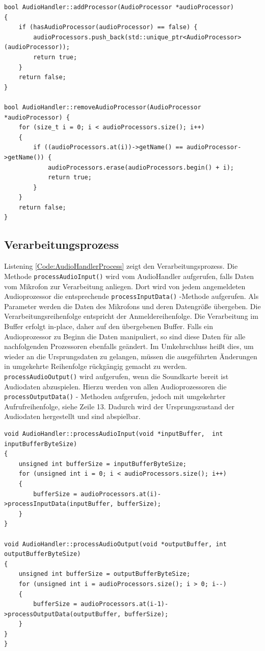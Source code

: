 \begin{lstlisting}[caption={An- und Abmeldeprozess von Audioprozessoren im AudioHandler},label={Code:AudioHandlerAdd}]
bool AudioHandler::addProcessor(AudioProcessor *audioProcessor)
{
	if (hasAudioProcessor(audioProcessor) == false) {
		audioProcessors.push_back(std::unique_ptr<AudioProcessor>(audioProcessor));
		return true;
	}
	return false;
}

bool AudioHandler::removeAudioProcessor(AudioProcessor *audioProcessor) {
	for (size_t i = 0; i < audioProcessors.size(); i++)
	{
		if ((audioProcessors.at(i))->getName() == audioProcessor->getName()) {
			audioProcessors.erase(audioProcessors.begin() + i);
			return true;
		}	
	}
	return false;
}
\end{lstlisting}

\subsection{Verarbeitungsprozess}
Listening \ref{Code:AudioHandlerProcess} zeigt den Verarbeitungsprozess. Die Methode \texttt{processAudioInput()} wird vom AudioHandler aufgerufen, falls Daten vom Mikrofon zur Verarbeitung anliegen. Dort wird von jedem angemeldeten Audioprozessor die entsprechende \texttt{processInputData()} -Methode aufgerufen. Als Parameter werden die Daten des Mikrofons und deren Datengröße übergeben. Die Verarbeitungsreihenfolge entspricht der Anmeldereihenfolge. Die Verarbeitung im Buffer erfolgt in-place, daher auf den übergebenen Buffer. Falls ein Audioprozessor zu Beginn die Daten manipuliert, so sind diese Daten für alle nachfolgenden Prozessoren ebenfalls geändert. Im Umkehrschluss heißt dies, um wieder an die Ursprungsdaten zu gelangen, müssen die ausgeführten Änderungen in umgekehrte Reihenfolge rückgängig gemacht zu werden. \texttt{processAudioOutput()} wird aufgerufen, wenn die Soundkarte bereit ist Audiodaten abzuspielen. Hierzu werden von allen Audioprozessoren die \texttt{processOutputData()} - Methoden aufgerufen, jedoch mit umgekehrter Aufrufreihenfolge, siehe Zeile 13. Dadurch wird der Ursprungszustand der Audiodaten hergestellt und sind abspielbar.

\begin{lstlisting}[caption={Verarbeitungsprozess des AudioHandlers},label={Code:AudioHandlerProcess}]
void AudioHandler::processAudioInput(void *inputBuffer,  int inputBufferByteSize)
{
	unsigned int bufferSize = inputBufferByteSize;
	for (unsigned int i = 0; i < audioProcessors.size(); i++)
	{
		bufferSize = audioProcessors.at(i)->processInputData(inputBuffer, bufferSize);
	}
}

void AudioHandler::processAudioOutput(void *outputBuffer, int outputBufferByteSize)
{
	unsigned int bufferSize = outputBufferByteSize;
	for (unsigned int i = audioProcessors.size(); i > 0; i--)
	{
		bufferSize = audioProcessors.at(i-1)->processOutputData(outputBuffer, bufferSize);
	}
}
}\end{lstlisting}

